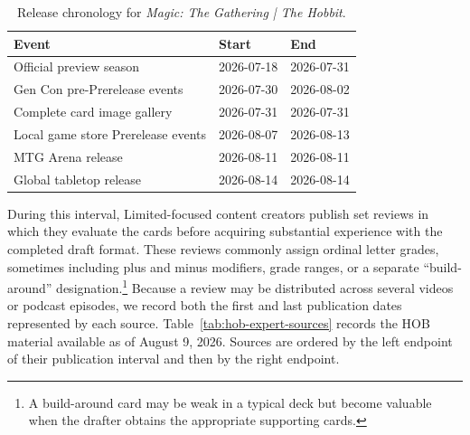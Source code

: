 \documentclass[11pt]{article}
\numberwithin{equation}{section}
\begin{document}
\begin{table}[tb]
\centering
\caption{Release chronology for \emph{Magic: The Gathering | The Hobbit}.}
\label{tab:hob-release-timeline}
\setlength{\tabcolsep}{9pt}
\begin{tabular}{lll}
\toprule
Event & Start & End \\
\midrule
Official preview season & 2026-07-18 & 2026-07-31 \\
Gen Con pre-Prerelease events & 2026-07-30 & 2026-08-02 \\
Complete card image gallery & 2026-07-31 & 2026-07-31 \\
Local game store Prerelease events & 2026-08-07 & 2026-08-13 \\
MTG Arena release & 2026-08-11 & 2026-08-11 \\
Global tabletop release & 2026-08-14 & 2026-08-14 \\
\bottomrule
\end{tabular}
\end{table}

During this interval, Limited-focused content creators publish set reviews in which they evaluate the cards before acquiring substantial experience with the completed draft format. These reviews commonly assign ordinal letter grades, sometimes including plus and minus modifiers, grade ranges, or a separate ``build-around'' designation.\footnote{A build-around card may be weak in a typical deck but become valuable when the drafter obtains the appropriate supporting cards.} Because a review may be distributed across several videos or podcast episodes, we record both the first and last publication dates represented by each source. Table~\ref{tab:hob-expert-sources} records the HOB material available as of August 9, 2026. Sources are ordered by the left endpoint of their publication interval and then by the right endpoint.
\end{document}
